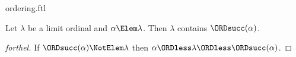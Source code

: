 \documentclass{stex}
\begin{document}
\begin{smodule}{ordering.ftl}
\begin{proposition}[forthel]
  Let $\lambda$ be a limit ordinal and $\alpha \Elem \lambda$.
  Then $\lambda$ contains $\ORDsucc(\alpha)$.
\end{proposition}
\begin{proof}[forthel]
  If $\ORDsucc(\alpha) \NotElem \lambda$ then $\alpha \ORDless \lambda \ORDless \ORDsucc(\alpha)$.
\end{proof}
\end{smodule}
\end{document}
